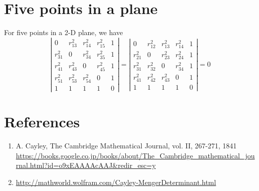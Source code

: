 \documentclass{article}
\begin{document}
\section{Five points in a plane}
\label{sec-2}
For five points in a 2-D plane, we have
\begin{equation}
\label{}
\left|\begin{array}{ccccc}
0 &  r_{13}^2 & r_{14}^2 & r_{15}^2 & 1 \\
r_{31}^2 &  0 & r_{34}^2 & r_{35}^2 & 1 \\
r_{41}^2 &  r_{43}^2 & 0 & r_{45}^2 & 1 \\
r_{51}^2 &  r_{53}^2 & r_{54}^2 & 0 & 1 \\
 1 & 1 & 1 & 1 & 0  
\end{array}\right|=
\left|\begin{array}{ccccc}
0 &  r_{12}^2 & r_{13}^2 & r_{14}^2 & 1 \\
r_{21}^2 &  0 & r_{23}^2 & r_{24}^2 & 1 \\
r_{31}^2 &  r_{32}^2 & 0 & r_{34}^2 & 1 \\
r_{41}^2 &  r_{42}^2 & r_{43}^2 & 0 & 1 \\
 1 & 1 & 1 & 1 & 0  
\end{array}\right|=0
\end{equation} 

\section{References}
\label{sec-3}
\begin{enumerate}
\item A. Cayley, The Cambridge Mathematical Journal, vol. II, 267-271, 1841 \url{https://books.google.co.jp/books/about/The_Cambridge_mathematical_journal.html?id=o9xEAAAAcAAJ&redir_esc=y}
\item \url{http://mathworld.wolfram.com/Cayley-MengerDeterminant.html}
\end{enumerate}
\end{document}

